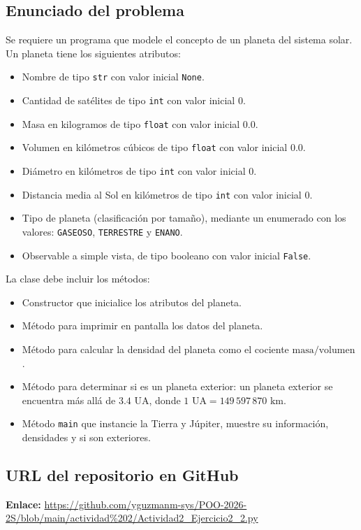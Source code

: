 \documentclass[11pt,a4paper]{article}
\begin{document}
\subsection{Enunciado del problema}
Se requiere un programa que modele el concepto de un planeta del sistema solar. Un planeta tiene los siguientes atributos:
\begin{itemize}
    \item Nombre de tipo \texttt{str} con valor inicial \texttt{None}.
    \item Cantidad de satélites de tipo \texttt{int} con valor inicial $0$.
    \item Masa en kilogramos de tipo \texttt{float} con valor inicial $0.0$.
    \item Volumen en kilómetros cúbicos de tipo \texttt{float} con valor inicial $0.0$.
    \item Diámetro en kilómetros de tipo \texttt{int} con valor inicial $0$.
    \item Distancia media al Sol en kilómetros de tipo \texttt{int} con valor inicial $0$.
    \item Tipo de planeta (clasificación por tamaño), mediante un enumerado con los valores: \texttt{GASEOSO}, \texttt{TERRESTRE} y \texttt{ENANO}.
    \item Observable a simple vista, de tipo booleano con valor inicial \texttt{False}.
\end{itemize}

La clase debe incluir los métodos:
\begin{itemize}
    \item Constructor que inicialice los atributos del planeta.
    \item Método para imprimir en pantalla los datos del planeta.
    \item Método para calcular la densidad del planeta como el cociente $\text{masa} / \text{volumen}$.
    \item Método para determinar si es un planeta exterior: un planeta exterior se encuentra más allá de $3.4\text{ UA}$, donde $1\text{ UA} = 149\,597\,870\text{ km}$.
    \item Método \texttt{main} que instancie la Tierra y Júpiter, muestre su información, densidades y si son exteriores.
\end{itemize}

\subsection{URL del repositorio en GitHub}
\noindent \textbf{Enlace:} \url{https://github.com/yguzmanm-sys/POO-2026-2S/blob/main/actividad%202/Actividad2_Ejercicio2_2.py}
\end{document}
